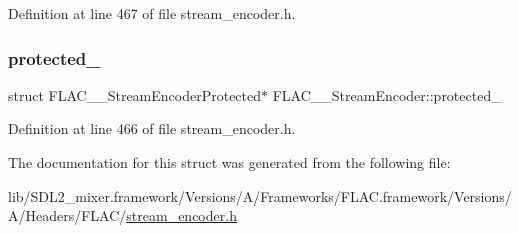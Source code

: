 Definition at line 467 of file stream\+\_\+encoder.\+h.

\mbox{\label{struct_f_l_a_c_____stream_encoder_a2820d2ad5c6395289b2abc7dc7399f76}} 
\subsubsection{\texorpdfstring{protected\_}{protected\_}}
{\footnotesize\ttfamily struct F\+L\+A\+C\+\_\+\+\_\+\+Stream\+Encoder\+Protected$\ast$ F\+L\+A\+C\+\_\+\+\_\+\+Stream\+Encoder\+::protected\+\_\+}



Definition at line 466 of file stream\+\_\+encoder.\+h.



The documentation for this struct was generated from the following file\+:\begin{DoxyCompactItemize}
\item 
lib/\+S\+D\+L2\+\_\+mixer.\+framework/\+Versions/\+A/\+Frameworks/\+F\+L\+A\+C.\+framework/\+Versions/\+A/\+Headers/\+F\+L\+A\+C/\mbox{\hyperlink{stream__encoder_8h}{stream\+\_\+encoder.\+h}}\end{DoxyCompactItemize}
